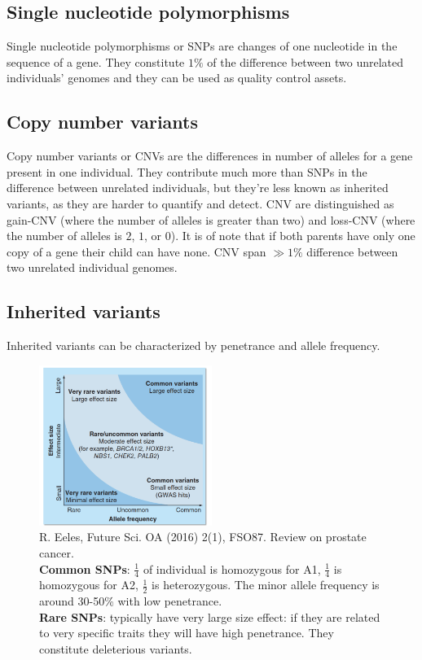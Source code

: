 	\subsection{Single nucleotide polymorphisms}
	Single nucleotide polymorphisms or SNPs are changes of one nucleotide in the sequence of a gene.
	They constitute $1\%$ of the difference between two unrelated individuals' genomes and they can be used as quality control assets.

	\subsection{Copy number variants}
	Copy number variants or CNVs are the differences in number of alleles for a gene present in one individual.
	They contribute much more than SNPs in the difference between unrelated individuals, but they're less known as inherited variants, as they are harder to quantify and detect.
	CNV are distinguished as gain-CNV (where the number of alleles is greater than two) and loss-CNV (where the number of alleles is $2$, $1$, or $0$).
	It is of note that if both parents have only one copy of a gene their child can have none.
	CNV span $\gg1\%$ difference between two unrelated individual genomes.

	\subsection{Inherited variants}
	Inherited variants can be characterized by penetrance and allele frequency.

	\begin{figure}[H]
		\centering
		\includegraphics[width=0.5\textwidth]{relevance.png}
		\caption{R. Eeles, Future Sci. OA (2016) 2(1), FSO87. Review on prostate cancer.\\
			\textbf{Common SNPs}: $\frac{1}{4}$ of individual is homozygous for A1, $\frac{1}{4}$ is homozygous for A2, $\frac{1}{2}$ is heterozygous. The minor allele frequency is around 30-50\% with low penetrance.\\
			\textbf{Rare SNPs}: typically have very large size effect: if they are related to very specific traits they will have high penetrance. They constitute deleterious variants.}
		\label{fig:relevance}
	\end{figure}


